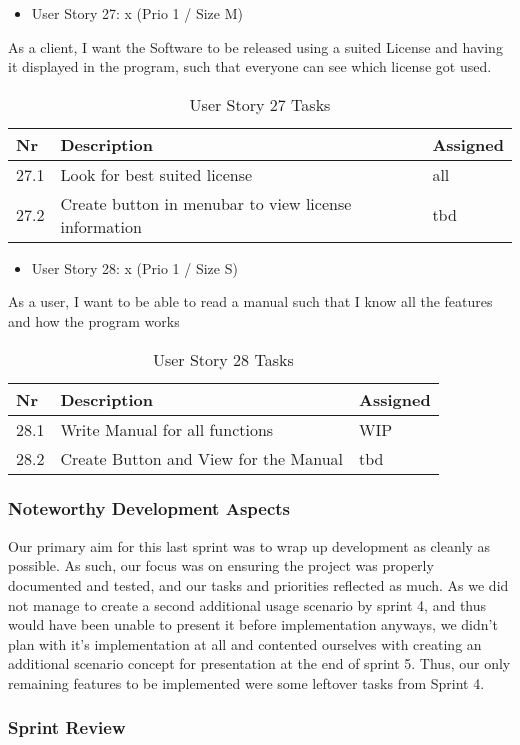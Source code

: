 \begin{itemize}
	\item User Story 27: x (Prio 1 / Size M)
	\end{itemize}
As a client,
I want the Software to be released using a suited License and having it displayed in the program,
such that everyone can see which license got used.	
\begin{table}[h]
  \caption{User Story 27 Tasks}
  \label{Story 23 Tasks}
  \centering
  \begin{tabular}{p{1cm}|p{5cm}|p{3cm}|}
  	Nr & Description & Assigned \\ 
  	\hline
  	27.1 & Look for best suited license & all \\ 
  	\hline
  	27.2 & Create button in menubar to view license information & tbd \\ 
  	\hline
  \end{tabular}
\end{table}

\begin{itemize}
	\item User Story 28: x (Prio 1 / Size S)
	\end{itemize}
As a user,
I want to be able to read a manual
such that I know all the features and how the program works
\begin{table}[h]
  \caption{User Story 28 Tasks}
  \label{Story 28 Tasks}
  \centering
  \begin{tabular}{p{1cm}|p{5cm}|p{3cm}|}
  	Nr & Description & Assigned \\ 
  	\hline
  	28.1 & Write Manual for all functions & WIP \\ 
  	\hline
  	28.2 & Create Button and View for the Manual & tbd \\ 
  	\hline
  \end{tabular}
\end{table}

\subsubsection*{Noteworthy Development Aspects}

Our primary aim for this last sprint was to wrap up development as cleanly as possible. 
As such, our focus was on ensuring the project was properly documented and tested, and our tasks and priorities reflected as much. 
As we did not manage to create a second additional usage scenario by sprint 4, and thus would have been unable to present it before implementation anyways, we didn't plan with it's implementation at all and contented ourselves with creating an additional scenario concept for presentation at the end of sprint 5. 
Thus, our only remaining features to be implemented were some leftover tasks from Sprint 4.

\subsubsection*{Sprint Review}


